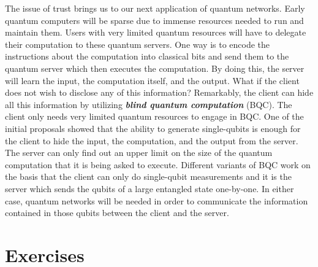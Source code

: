 The issue of trust brings us to our next application of quantum networks.
Early quantum computers will be sparse due to immense resources needed to run and maintain them.
Users with very limited quantum resources will have to delegate their computation to these quantum servers.
One way is to encode the instructions about the computation into classical bits and send them to the quantum server which then executes the computation.
By doing this, the server will learn the input, the computation itself, and the output.
What if the client does not wish to disclose any of this information?
Remarkably, the client can hide all this information by utilizing \textbf{\emph{blind quantum computation}} (BQC).
The client only needs very limited quantum resources to engage in BQC.
One of the initial proposals showed that the ability to generate single-qubits is enough for the client to hide the input, the computation, and the output from the server.
The server can only find out an upper limit on the size of the quantum computation that it is being asked to execute.
Different variants of BQC work on the basis that the client can only do single-qubit measurements and it is the server which sends the qubits of a large entangled state one-by-one.
In either case, quantum networks will be needed in order to communicate the information contained in those qubits between the client and the server.


\newpage
\section{Exercises}

